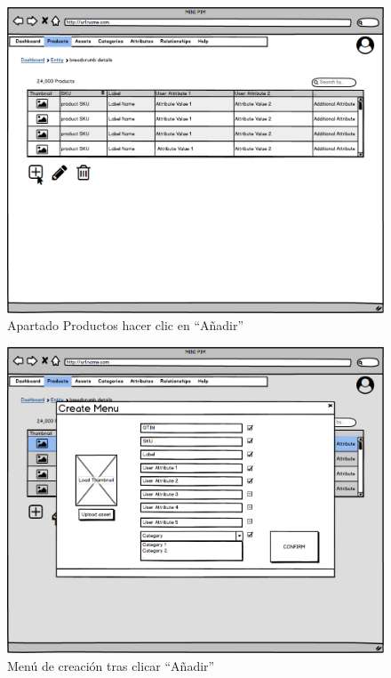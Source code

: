 \begin{figure}[H]
    \includegraphics[width=1\linewidth]{mockups/RF2.1_boceto1.png}
    \caption{Apartado Productos hacer clic en \enquote{Añadir}}
   \end{figure}
\vspace{1.0cm}

\begin{figure}[H]
    \includegraphics[width=1\linewidth]{mockups/RF2.1_bocetoCreacionV2.png}
    \caption{Menú de creación tras clicar \enquote{Añadir}}
   \end{figure}
\vspace{1.0cm}

\newpage %